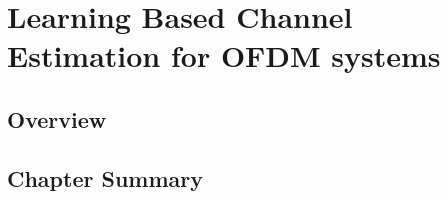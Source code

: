 \chapter{Learning Based Channel Estimation for OFDM systems}
\label{cha:learning_ch_est}
\section{Overview}
\label{sec:ch2overview}
\section{Chapter Summary}
\label{sec:ch2summary}


